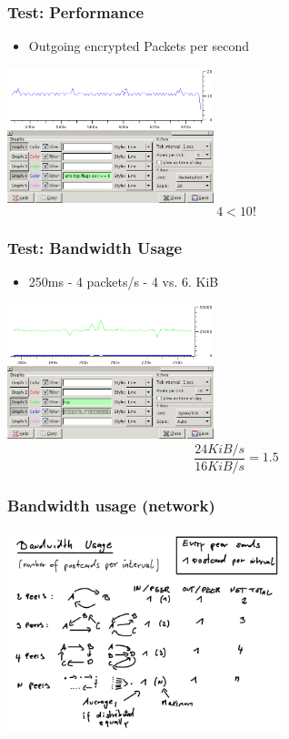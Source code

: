 \documentclass{beamer}
\begin{document}
\frame
{
  \frametitle{Test: Performance}
  \begin{itemize}
          \item Outgoing encrypted Packets per second
   \end{itemize}
  \begin{center}
   \includegraphics[width=6cm]{../noise-no-limit.png}
   $$4 < 10!$$
  \end{center}
}


\frame
{
  \frametitle{Test: Bandwidth Usage}
  \begin{itemize}
          \item 250ms - 4 packets/s - 4 vs. 6. KiB
   \end{itemize}
  \begin{center}
   \includegraphics[width=6cm]{../bandwidth-0250.png}
   $$\frac{24 KiB/s}{16 KiB/s} = 1.5$$
  \end{center}
}

\frame
{
  \frametitle{Bandwidth usage (network)}
  \begin{center}
   \includegraphics[width=8cm]{../bandwidth.png}
  \end{center}
}
\end{document}
